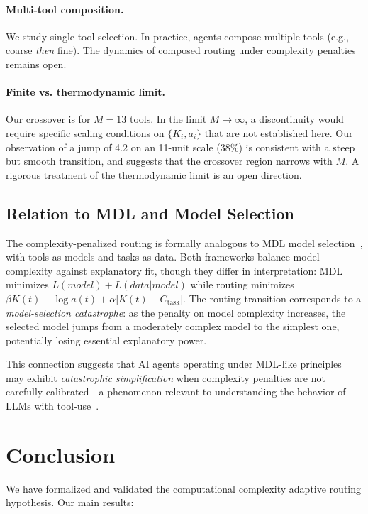 \documentclass[12pt]{article}
\theoremstyle{definition}
\begin{document}
\paragraph{Multi-tool composition.} We study single-tool selection. In practice, agents compose multiple tools (e.g., coarse \emph{then} fine). The dynamics of composed routing under complexity penalties remains open.

\paragraph{Finite vs. thermodynamic limit.} Our crossover is for $M = 13$ tools. In the limit $M \to \infty$, a discontinuity would require specific scaling conditions on $\{K_i, a_i\}$ that are not established here. Our observation of a jump of 4.2 on an 11-unit scale (38\%) is consistent with a steep but smooth transition, and suggests that the crossover region narrows with $M$. A rigorous treatment of the thermodynamic limit is an open direction.

\subsection{Relation to MDL and Model Selection}

The complexity-penalized routing is formally analogous to MDL model selection~\cite{r89-grunwald2007-mdl}, with tools as models and tasks as data. Both frameworks balance model complexity against explanatory fit, though they differ in interpretation: MDL minimizes $L(model) + L(data|model)$ while routing minimizes $\beta K(t) - \log a(t) + \alpha|K(t) - C_{\mathrm{task}}|$. The routing transition corresponds to a \emph{model-selection catastrophe}: as the penalty on model complexity increases, the selected model jumps from a moderately complex model to the simplest one, potentially losing essential explanatory power.

This connection suggests that AI agents operating under MDL-like principles may exhibit \emph{catastrophic simplification} when complexity penalties are not carefully calibrated---a phenomenon relevant to understanding the behavior of LLMs with tool-use~\cite{r91-wang2023-toolformer}.

\section{Conclusion}

We have formalized and validated the computational complexity adaptive routing hypothesis. Our main results:
\end{document}
